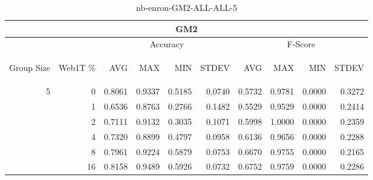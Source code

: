 \begin{center}
\begin{table}[htbp]
\begin{tabular}{ | r | r | r | r | r | r | r | r | r | r |}
\hline
\multicolumn{10}{|c|}{GM2}\\
\hline
 & & \multicolumn{4}{|c|}{Accuracy} & \multicolumn{4}{|c|}{F-Score}\\ \cline{3-10}
\begin{sideways}Group Size\end{sideways} & \begin{sideways}Web1T \%\end{sideways} & \begin{sideways}AVG\end{sideways} & \begin{sideways}MAX\end{sideways} & \begin{sideways}MIN\end{sideways} & \begin{sideways}STDEV\end{sideways} & \begin{sideways}AVG\end{sideways} & \begin{sideways}MAX\end{sideways} & \begin{sideways}MIN\end{sideways} & \begin{sideways}STDEV\end{sideways}\\
\hline
\multirow{6}{*}{5}
 & 0 & 0.8061 & 0.9337 & 0.5185 & 0.0740 & 0.5732 & 0.9781 & 0.0000 & 0.3272\\ \cline{2-10}
 & 1 & 0.6536 & 0.8763 & 0.2766 & 0.1482 & 0.5529 & 0.9529 & 0.0000 & 0.2414\\ \cline{2-10}
 & 2 & 0.7111 & 0.9132 & 0.3035 & 0.1071 & 0.5998 & 1.0000 & 0.0000 & 0.2359\\ \cline{2-10}
 & 4 & 0.7320 & 0.8899 & 0.4797 & 0.0958 & 0.6136 & 0.9656 & 0.0000 & 0.2288\\ \cline{2-10}
 & 8 & 0.7961 & 0.9224 & 0.5879 & 0.0753 & 0.6670 & 0.9755 & 0.0000 & 0.2165\\ \cline{2-10}
 & 16 & 0.8158 & 0.9489 & 0.5926 & 0.0732 & 0.6752 & 0.9759 & 0.0000 & 0.2286\\ \cline{2-10}
\hline
\end{tabular}
\caption{nb-enron-GM2-ALL-ALL-5}
\end{table}
\end{center}

